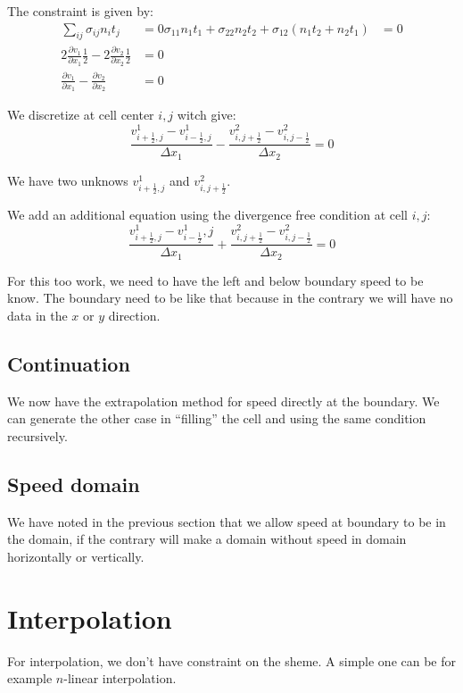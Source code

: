 The constraint is given by:
\begin{align}
	\sum_{ij}\sigma_{ij}n_{i}t_{j}&=0
	\sigma_{11}n_{1}t_{1}+\sigma_{22}n_{2}t_{2}+\sigma_{12}(n_{1}t_{2}+n_{2}t_{1})&=0\\
	2\frac{\partial v_{1}}{\partial x_{1}}\frac{1}{2}-2\frac{\partial v_{2}}{\partial x_{2}}\frac{1}{2}&=0\\
	\frac{\partial v_{1}}{\partial x_{1}}-\frac{\partial v_{2}}{\partial x_{2}}&=0
\end{align}

We discretize at cell center $i,j$ witch give:
\begin{equation}
	\frac{v^{1}_{i+\frac{1}{2},j}-v^{1}_{i-\frac{1}{2},j}}{\Delta x_{1}}-\frac{v^{2}_{i,j+\frac{1}{2}}-v^{2}_{i,j-\frac{1}{2}}}{\Delta x_{2}}=0
\end{equation}

We have two unknows $v^{1}_{i+\frac{1}{2},j}$ and $v^{2}_{i,j+\frac{1}{2}}$.

We add an additional equation using the divergence free condition at cell $i,j$:
\begin{equation}
	\frac{v^{1}_{i+\frac{1}{2},j}-v^{1}_{i-\frac{1}{2}},j}{\Delta x_{1}}+\frac{v^{2}_{i,j+\frac{1}{2}}-v^{2}_{i,j-\frac{1}{2}}}{\Delta x_2}=0
\end{equation}

For this too work, we need to have the left and below boundary speed to be know.
The boundary need to be like that because in the contrary we will have no data in the $x$ or $y$ direction.

\subsection{Continuation}

We now have the extrapolation method for speed directly at the boundary.
We can generate the other case in ``filling'' the cell and using the same condition recursively.

\subsection{Speed domain}

We have noted in the previous section that we allow speed at boundary to be in the domain, if the contrary will make a domain without speed in domain
horizontally or vertically.

\section{Interpolation}

For interpolation, we don't have constraint on the sheme. A simple one can be for example $n$-linear interpolation.





